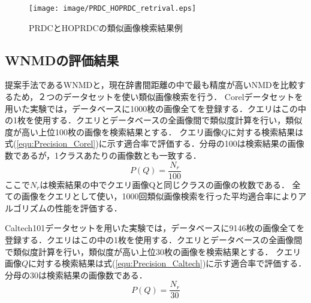 \begin{figure}[tb]
\centering
\texttt{[image: image/PRDC\_HOPRDC\_retrival.eps]}
\caption{PRDCとHOPRDCの類似画像検索結果例}
\label{fig:PRDC_HOPRDC_retrival.eps}
\end{figure}


\subsection{WNMDの評価結果}
提案手法であるWNMDと，現在辞書間距離の中で最も精度が高いNMDを比較するため，２つのデータセットを使い類似画像検索を行う．
Corelデータセットを用いた実験では，データベースに1000枚の画像全てを登録する．クエリはこの中の1枚を使用する．クエリとデータベースの全画像間で類似度計算を行い，類似度が高い上位100枚の画像を検索結果とする．
クエリ画像$Q$に対する検索結果は式(\ref{equ:Precision_Corel})に示す適合率で評価する．分母の100は検索結果の画像数であるが，1クラスあたりの画像数とも一致する．
\begin{equation}
P(Q) = \frac{N_r}{100}
\label{equ:Precision_Corel}
\end{equation}
ここで$N_r$は検索結果の中でクエリ画像Qと同じクラスの画像の枚数である．
全ての画像をクエリとして使い，1000回類似画像検索を行った平均適合率によりアルゴリズムの性能を評価する．

Caltech101データセットを用いた実験では，データベースに9146枚の画像全てを登録する．クエリはこの中の1枚を使用する．クエリとデータベースの全画像間で類似度計算を行い，類似度が高い上位30枚の画像を検索結果とする．
クエリ画像$Q$に対する検索結果は式(\ref{equ:Precision_Caltech})に示す適合率で評価する．分母の30は検索結果の画像数である．
\begin{equation}
P(Q) = \frac{N_r}{30}
\label{equ:Precision_Caltech}
\end{equation}

